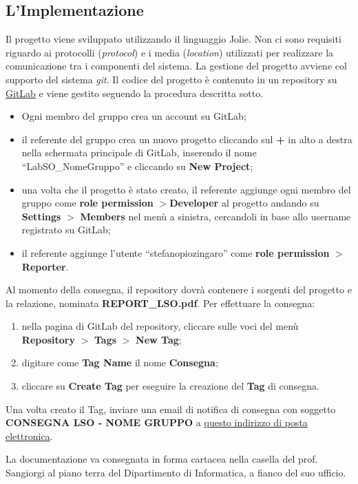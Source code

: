 \subsection{L'Implementazione}
Il progetto viene sviluppato utilizzando il linguaggio Jolie. Non ci sono requisiti riguardo ai protocolli (\textit{protocol}) e i media (\textit{location}) utilizzati per realizzare la comunicazione tra i componenti del sistema. La gestione del progetto avviene col supporto del sistema \textit{git}. Il codice del progetto è contenuto in un repository su \href{http://gitlab.com}{GitLab} e viene gestito seguendo la procedura descritta sotto.
%
\begin{tcolorbox}[colback=blue!20!white,colframe=blue!75!black,title=GitLab]
\begin{itemize}
    \item Ogni membro del gruppo crea un account su GitLab;
    \item il referente del gruppo  crea un nuovo progetto cliccando sul \textbf{+} in alto a destra nella schermata principale di GitLab, inserendo il nome ``LabSO\_NomeGruppo'' e cliccando su \textbf{New Project};
    \item una volta che il progetto è stato creato, il referente aggiunge ogni membro del gruppo come \textbf{role permission} $>$\textbf{Developer} al progetto andando su \textbf{Settings} $>$ \textbf{Members} nel menù a sinistra, cercandoli in base allo username registrato su GitLab;
    \item il referente aggiunge l'utente ``stefanopiozingaro'' come \textbf{role permission} $>$ \textbf{Reporter}.
\end{itemize}
\end{tcolorbox}
%
Al momento della consegna, il repository dovrà contenere i sorgenti del progetto e la relazione, nominata \textbf{REPORT\_LSO.pdf}. Per effettuare la consegna:
\begin{enumerate}
    \item nella pagina di GitLab del repository, cliccare sulle voci del menù \textbf{Repository} $>$ \textbf{Tags} $>$ \textbf{New Tag}; 
    \item digitare come \textbf{Tag Name} il nome \textbf{Consegna};
    \item cliccare su \textbf{Create Tag} per eseguire la creazione del \textbf{Tag} di consegna.
\end{enumerate}
%
Una volta creato il Tag, inviare una email di notifica di consegna con soggetto \textbf{CONSEGNA LSO - NOME GRUPPO} a \href{stefanopio.zingaro@unibo.it}{questo indirizzo di posta elettronica}. 
\begin{tcolorbox}[colback=yellow!20!white,colframe=yellow!75!black,title=\textbf{N.B.}]
    La documentazione va consegnata in forma cartacea nella casella del prof. Sangiorgi al piano terra del Dipartimento di Informatica, a fianco del suo ufficio.
\end{tcolorbox}

